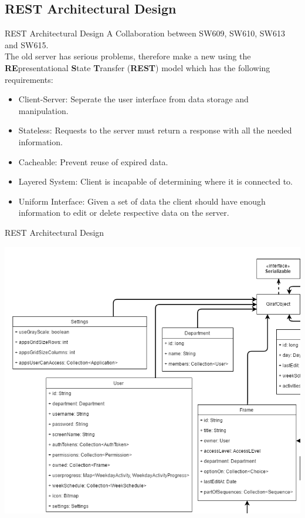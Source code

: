 \subsection{REST Architectural Design}
\begin{frame}{REST Architectural Design}
A Collaboration between SW609, SW610, SW613 and SW615.\\

The old server has serious problems, therefore make a new using the \textbf{RE}presentational \textbf{S}tate \textbf{T}ransfer (\textbf{REST}) model which has the following requirements:
\begin{itemize}
\item Client-Server: Seperate the user interface from data storage and manipulation.
\item Stateless: Requests to the server must return a response with all the needed information.
\item Cacheable: Prevent reuse of expired data.
\item Layered System: Client is incapable of determining where it is connected to.
\item Uniform Interface: Given a set of data the client should have enough information to edit or delete respective data on the server.
\end{itemize}
\end{frame}

\begin{frame}{REST Architectural Design}
\begin{center}
\begin{minipage}[H]{0.9\linewidth}
\includegraphics[scale=0.43]{figures/Giraf_RestModelV4.PNG}
\end{minipage}
\end{center}
\end{frame}

